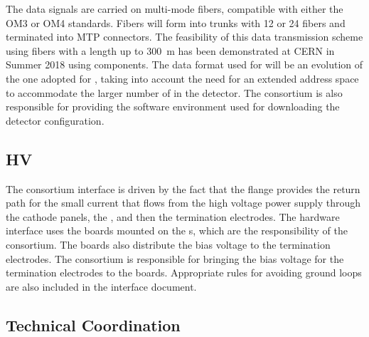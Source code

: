 The data signals are carried on multi-mode fibers, compatible with 
either the OM3 or OM4 standards. Fibers will form into trunks with 
12 or 24 fibers and terminated into MTP connectors. The feasibility
of this data transmission scheme using fibers with a length up
to \SI{300}{m} has been demonstrated at CERN in Summer 2018 using 
 components. The data format used for 
 will be an evolution of the one adopted for
, taking into account the need for an 
extended address space to accommodate the larger number of
 in the detector. The  consortium
is also responsible for providing the software environment
used for downloading the detector configuration.

\subsection{HV}
\label{sec:fdsp-tpcelec-interfaces-hv}

The  consortium interface 
is driven by the fact that the  flange provides the return path for
the small current that flows from the high voltage power 
supply through the cathode panels, the , and then
the termination electrodes. The hardware interface uses
the  boards mounted on the s, which
are  the responsibility of the  consortium. The
 boards also distribute the bias voltage to the  termination electrodes. The  consortium
is responsible for bringing the bias voltage for the  termination electrodes to the  boards. Appropriate
rules for avoiding ground loops are also included in the 
interface document.

\subsection{Technical Coordination}
\label{sec:fdsp-tpcelec-interfaces-tc}

